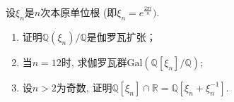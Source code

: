 \begin{solution}
    
\end{solution}

\begin{problem}
    设$\xi_n$是$n$次本原单位根 (即$\xi_n = e^{\frac{2\pi i}n})$.
\begin{enumerate}[(1)]
    \item 证明$\mathbb{Q}(\xi_n)/\mathbb{Q}$是伽罗瓦扩张；
    \item 当$n = 12$时, 求伽罗瓦群$\mathrm{Gal}(\mathbb{Q}[\xi_n]/\mathbb{Q})$;
    \item 设$n > 2$为奇数, 证明$\mathbb{Q}[\xi_n] \cap \mathbb{R} = \mathbb{Q}[\xi_n + \xi_n^{-1}]$.
\end{enumerate}
\end{problem}

\begin{solution}
    
\end{solution}